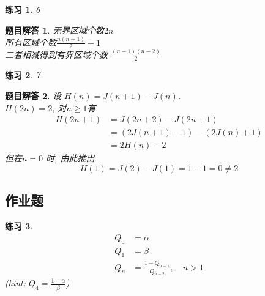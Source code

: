 \documentclass[mode=geye]{elegantnote}
\newtheorem{exercise}{练习}
\newtheorem{answer}{题目解答}
\begin{document}
\begin{exercise}6
\end{exercise}

\begin{answer}
	无界区域个数$ 2n $\\
	所有区域个数$ \frac{n(n+1)}{2}+1 $ \\
	二者相减得到有界区域个数 $ \frac{(n-1)(n-2)}{2} $
\end{answer}

\begin{exercise}7
\end{exercise}

\begin{answer}
	设 $ H(n) = J(n+1) - J(n) $.\\
	$ H(2n) = 2 $, 对$ n\geqslant 1 $有\\
	\begin{align*}
		 H(2n+1)
		 &= J(2n+2) - J(2n+1) \\
		 &= (2J(n+1)-1) - (2J(n)+1)\\
		 &= 2H(n) - 2
	\end{align*}
	但在$ n=0 $	时, 由此推出
	\begin{equation*}
		H(1) = J(2)-J(1) = 1 - 1 = 0 \neq 2
	\end{equation*}
\end{answer}

\subsection{作业题}
\begin{exercise}	
	\begin{align*}
		Q_0 &= \alpha\\
		Q_1 &= \beta \\
		Q_n &= \frac{1+Q_{n-1}}{Q_{n-2}} ,\quad n>1
	\end{align*}
	(hint: $ Q_4 = \frac{1+\alpha}{\beta} $)
\end{exercise}
\end{document}
